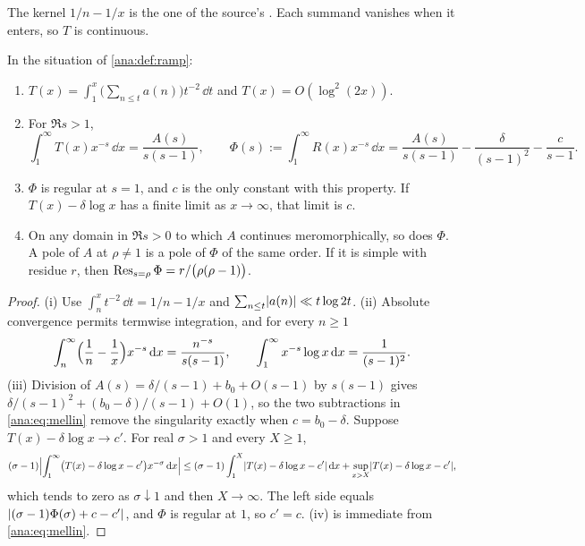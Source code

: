 The kernel $1/n-1/x$ is the one of the source's . Each summand vanishes when it
enters, so $T$ is continuous.

\begin{lemma}\label{ana:lem:mellin}
In the situation of \cref{ana:def:ramp}:
\begin{enumerate}[label=\textup{(\roman*)}]
\item $T(x)=\int_1^x\bigl(\sum_{n\le t}a(n)\bigr)t^{-2}\,\dd t$ and $T(x)=O(\log^2(2x))$.
\item For $\Re s>1$,
 \begin{equation}\label{ana:eq:mellin}
  \int_1^\infty T(x)x^{-s}\,\dd x=\frac{A(s)}{s(s-1)},\qquad
  \Phi(s):=\int_1^\infty R(x)x^{-s}\,\dd x
  =\frac{A(s)}{s(s-1)}-\frac{\delta}{(s-1)^2}-\frac{c}{s-1}.
 \end{equation}
\item $\Phi$ is regular at $s=1$, and $c$ is the only constant with this property. If
 $T(x)-\delta\log x$ has a finite limit as $x\to\infty$, that limit is $c$.
\item On any domain in $\Re s>0$ to which $A$ continues meromorphically, so does $\Phi$. A pole
 of $A$ at $\rho\ne1$ is a pole of $\Phi$ of the same order. If it is simple with residue $r$,
 then $\operatorname{Res}_{s=\rho}\Phi=r/\bigl(\rho(\rho-1)\bigr)$.
\end{enumerate}
\end{lemma}

\begin{proof}
(i) Use $\int_n^xt^{-2}\,\dd t=1/n-1/x$ and $\sum_{n\le t}\lvert a(n)\rvert\ll t\log 2t$. (ii) Absolute
convergence permits termwise integration, and for every $n\ge1$
\[
 \int_n^\infty\Bigl(\frac1n-\frac1x\Bigr)x^{-s}\,\mathrm{d} x=\frac{n^{-s}}{s(s-1)},\qquad
 \int_1^\infty x^{-s}\log x\,\mathrm{d} x=\frac1{(s-1)^2}.
\]
(iii) Division of $A(s)=\delta/(s-1)+b_0+O(s-1)$ by $s(s-1)$ gives
$\delta/(s-1)^2+(b_0-\delta)/(s-1)+O(1)$, so the two subtractions in \eqref{ana:eq:mellin}
remove the singularity exactly when $c=b_0-\delta$. Suppose $T(x)-\delta\log x\to c'$. For real
$\sigma>1$ and every $X\ge1$,
\[
 (\sigma-1)\Bigl|\int_1^\infty\bigl(T(x)-\delta\log x-c'\bigr)x^{-\sigma}\,\mathrm{d} x\Bigr|
 \le(\sigma-1)\int_1^X\lvert T(x)-\delta\log x-c'\rvert\,\mathrm{d} x+\sup_{x>X}\lvert T(x)-\delta\log x-c'\rvert ,
\]
which tends to zero as $\sigma\downarrow1$ and then $X\to\infty$. The left side equals
$\lvert(\sigma-1)\Phi(\sigma)+c-c'\rvert$, and $\Phi$ is regular at $1$, so $c'=c$. (iv) is immediate
from \eqref{ana:eq:mellin}.
\end{proof}


